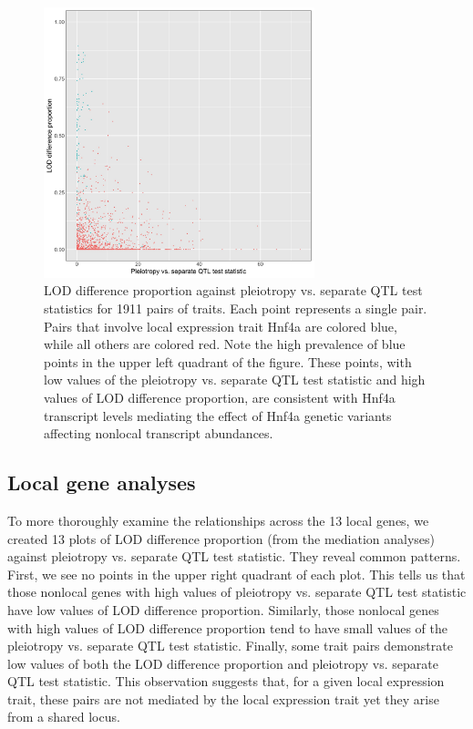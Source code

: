 \documentclass{article}
\begin{document}
\begin{figure}
    \centering
    \includegraphics[width = 0.7\textwidth]{lod-diff-prop-v-lrt.jpg}
    \caption{LOD difference proportion against pleiotropy vs. separate QTL test statistics for 1911 pairs of traits. Each point represents a single pair. Pairs that involve local expression trait Hnf4a are colored blue, while all others are colored red. Note the high prevalence of blue points in the upper left quadrant of the figure. These points, with low values of the pleiotropy vs. separate QTL test statistic and high values of LOD difference proportion, are consistent with Hnf4a transcript levels mediating the effect of Hnf4a genetic variants affecting nonlocal transcript abundances.}
    \label{fig:lod-diff-prop-v-lrt-all}
\end{figure}

\subsection{Local gene analyses}

To more thoroughly examine the relationships across the 13 local genes, we created 13 plots of LOD difference proportion (from the mediation analyses) against pleiotropy vs. separate QTL test statistic. They reveal common patterns. First, we see no points in the upper right quadrant of each plot. This tells us that those nonlocal genes with high values of pleiotropy vs. separate QTL test statistic have low values of LOD difference proportion. Similarly, those nonlocal genes with high values of LOD difference proportion tend to have small values of the pleiotropy vs. separate QTL test statistic. Finally, some trait pairs demonstrate low values of both the LOD difference proportion and pleiotropy vs. separate QTL test statistic. This observation suggests that, for a given local expression trait, these pairs are not mediated by the local expression trait yet they arise from a shared locus. 
\end{document}
